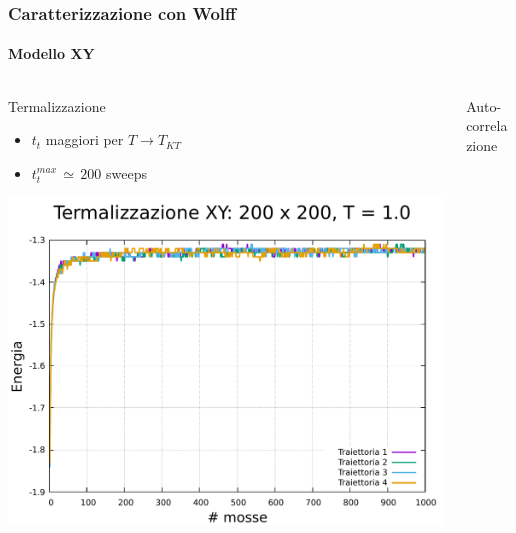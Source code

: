 
\begin{frame}
    \frametitle{Caratterizzazione con Wolff}
    \framesubtitle{Modello XY}

    \begin{columns}
        \begin{column}{0.33\textwidth}
            \begin{block}{Termalizzazione}

                \begin{itemize}[itemsep=0.5em, label=$\diamond$]
                    \item $t_{t}$ maggiori per $T \to T_{KT}$
                    \item $t_{t}^{max}\,\simeq\,200$ sweeps
                \end{itemize}

                \vspace{0.5cm}

                \centering
                \includegraphics[width=\textwidth]{../ModelloXY/analisi/term/graphTerm/term_200_1.0.pdf}
            
            \end{block}
        \end{column}
    
        \begin{column}{0.33\textwidth}
            \begin{block}{Auto-correlazione}


\end{block}
\end{column}
\end{columns}
\end{frame}
